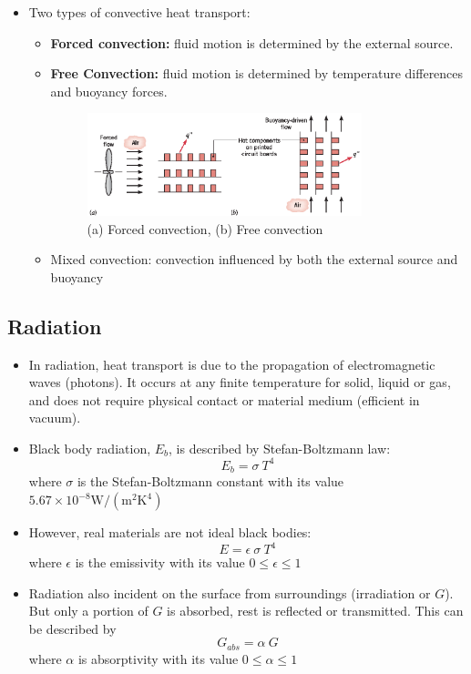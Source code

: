 \documentclass[12pt, a4paper]{article}
\begin{document}
\begin{itemize}
    \item Two types of convective heat transport:
    \begin{itemize}
        \item \textbf{Forced convection:} fluid motion is determined by the external source.
        \item \textbf{Free Convection:} fluid motion is determined by temperature differences and buoyancy forces.
    \begin{figure}[H]
        \centering
        \includegraphics[width = 0.8\textwidth]{img/forced_and_free_convection.eps}
        \caption{(a) Forced convection, (b) Free convection}
    \end{figure}

    \item Mixed convection: convection influenced by both the external source and buoyancy
    \end{itemize}
\end{itemize}
 
\subsection{Radiation}
\begin{itemize}
    \item In radiation, heat transport is due to the propagation of electromagnetic waves (photons). It occurs at any finite temperature for solid, liquid or gas, and does not require physical contact or material medium (efficient in vacuum).
    
    \item Black body radiation, $E_{b}$, is described by Stefan-Boltzmann law: 
    \[ E_{b} = \sigma \ T^{4} \] 
    where $\sigma$ is the Stefan-Boltzmann constant with its value $ 5.67\times10^{-8} \mathrm{W/(m^{2} K^{4})}$

    \item However, real materials are not ideal black bodies:  \[ E = \epsilon \ \sigma \ T^{4} \] where $\epsilon$ is the emissivity with its value $0 \leq \epsilon \leq 1$

    \item Radiation also incident on the surface from surroundings (irradiation or $G$). But only a portion of $G$ is absorbed, rest is reflected or transmitted. This can be described by \[ G_{abs} = \alpha  \ G \] where $\alpha$ is absorptivity with its value $0 \leq \alpha \leq 1$
\end{itemize}
\end{document}

